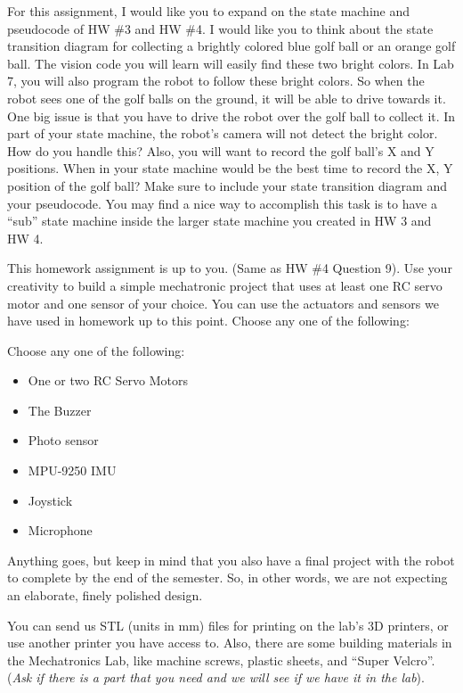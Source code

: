 \documentclass[11pt]{article}
\begin{document}
\MakeAssignmentTitle


For this assignment, I would like you to expand on the state machine and pseudocode of HW \#3 and HW \#4. I would like you to think about the state transition diagram for collecting a brightly colored blue golf ball or an orange golf ball. The vision code you will learn will easily find these two bright colors. In Lab 7, you will also program the robot to follow these bright colors. So when the robot sees one of the golf balls on the ground, it will be able to drive towards it. One big issue is that you have to drive the robot over the golf ball to collect it. In part of your state machine, the robot’s camera will not detect the bright color. How do you handle this? Also, you will want to record the golf ball's X and Y positions. When in your state machine would be the best time to record the X, Y position of the golf ball? Make sure to include your state transition diagram and your pseudocode. You may find a nice way to accomplish this task is to have a “sub” state machine inside the larger state machine you created in HW 3 and HW 4.


This homework assignment is up to you. (Same as HW \#4 Question 9). Use your creativity to build a simple mechatronic project that uses at least one RC servo motor and one sensor of your choice. You can use the actuators and sensors we have used in homework up to this point. Choose any one of the following:

Choose any one of the following:
\begin{itemize}
    \item One or two RC Servo Motors
    \item The Buzzer
    \item Photo sensor
    \item MPU-9250 IMU
    \item Joystick
    \item Microphone
\end{itemize}
%
Anything goes, but keep in mind that you also have a final project with the robot to complete by the end of the semester. So, in other words, we are not expecting an elaborate, finely polished design.

You can send us STL (units in mm) files for printing on the lab’s 3D printers, or use another printer you have access to. Also, there are some building materials in the Mechatronics Lab, like machine screws, plastic sheets, and “Super Velcro”. (\textit{Ask if there is a part that you need and we will see if we have it in the lab}).
\end{document}
